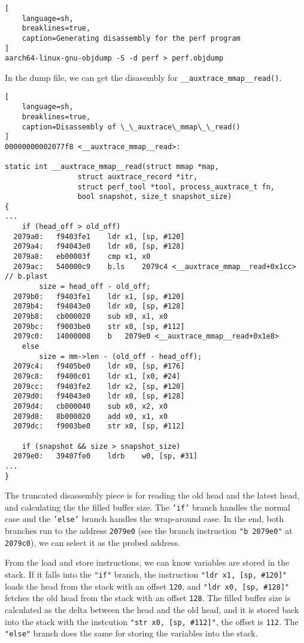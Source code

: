 \documentclass[11pt]{diazessay} %
\def\code#1{\texttt{#1}}
\begin{document}
\begin{lstlisting}[
  	language=sh,
	breaklines=true,
	caption=Generating disassembly for the perf program
]
aarch64-linux-gnu-objdump -S -d perf > perf.objdump
\end{lstlisting}

In the dump file, we can get the disasembly for \code{\_\_auxtrace\_mmap\_\_read()}.

\begin{lstlisting}[
  	language=sh,
	breaklines=true,
	caption=Disassembly of \_\_auxtrace\_mmap\_\_read()
]
00000000002077f8 <__auxtrace_mmap__read>:

static int __auxtrace_mmap__read(struct mmap *map,
				 struct auxtrace_record *itr,
				 struct perf_tool *tool, process_auxtrace_t fn,
				 bool snapshot, size_t snapshot_size)
{
...
	if (head_off > old_off)
  2079a0:	f9403fe1 	ldr	x1, [sp, #120]
  2079a4:	f94043e0 	ldr	x0, [sp, #128]
  2079a8:	eb00003f 	cmp	x1, x0
  2079ac:	540000c9 	b.ls	2079c4 <__auxtrace_mmap__read+0x1cc>  // b.plast
		size = head_off - old_off;
  2079b0:	f9403fe1 	ldr	x1, [sp, #120]
  2079b4:	f94043e0 	ldr	x0, [sp, #128]
  2079b8:	cb000020 	sub	x0, x1, x0
  2079bc:	f9003be0 	str	x0, [sp, #112]
  2079c0:	14000008 	b	2079e0 <__auxtrace_mmap__read+0x1e8>
	else
		size = mm->len - (old_off - head_off);
  2079c4:	f9405be0 	ldr	x0, [sp, #176]
  2079c8:	f9400c01 	ldr	x1, [x0, #24]
  2079cc:	f9403fe2 	ldr	x2, [sp, #120]
  2079d0:	f94043e0 	ldr	x0, [sp, #128]
  2079d4:	cb000040 	sub	x0, x2, x0
  2079d8:	8b000020 	add	x0, x1, x0
  2079dc:	f9003be0 	str	x0, [sp, #112]

	if (snapshot && size > snapshot_size)
  2079e0:	39407fe0 	ldrb	w0, [sp, #31]
...
}
\end{lstlisting}

The truncated disassembly piece is for reading the old head and the latest
head, and calculating the the filled buffer size. The \code{'if'} branch
handles the normal case and the \code{'else'} branch handles the wrap-around
case. In the end, both branches run to the address \code{2079e0} (see the
branch instruction \code{"b 2079e0"} at \code{2079c0}), we can select it as
the probed address.

From the load and store instructions, we can know variables are stored in the
stack. If it falls into the \code{"if"} branch, the instruction
\code{"ldr x1, [sp, \#120]"} loads the head from the stack with an offset
\code{120}, and \code{"ldr x0, [sp, \#128]"} fetches the old head from the
stack with an offset \code{128}. The filled buffer size is calculated as the
delta between the head and the old head, and it is stored back into the stack
with the instcution \code{"str x0, [sp, \#112]"}, the offset is \code{112}.
The \code{"else"} branch does the same for storing the variables into the
stack.
\end{document}
